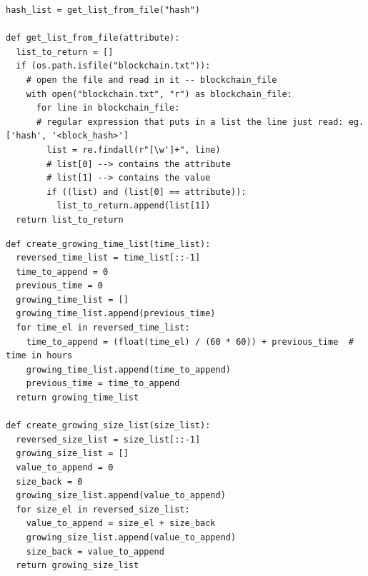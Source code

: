 \documentclass[USenglish]{uit-thesis}
\begin{document}
\begin{appendices}
\begin{lstlisting}[float, caption={Method that allows, given an attribute present in the blockchain.txt file, to create a list containing informations only about this quality using \emph{regular expressions}.}]
hash_list = get_list_from_file("hash")

def get_list_from_file(attribute):
  list_to_return = []
  if (os.path.isfile("blockchain.txt")):
    # open the file and read in it -- blockchain_file
    with open("blockchain.txt", "r") as blockchain_file:
      for line in blockchain_file:
      # regular expression that puts in a list the line just read: eg. ['hash', '<block_hash>']
        list = re.findall(r"[\w']+", line)
        # list[0] --> contains the attribute
        # list[1] --> contains the value
        if ((list) and (list[0] == attribute)):
          list_to_return.append(list[1])
  return list_to_return
\end{lstlisting}

\begin{lstlisting}[float, caption={Generation of the growing size and time lists. Calculated following the Equations~\ref{eq:growing_size},~\ref{eq:growing_time}.}]
def create_growing_time_list(time_list):
  reversed_time_list = time_list[::-1]
  time_to_append = 0
  previous_time = 0
  growing_time_list = []
  growing_time_list.append(previous_time)
  for time_el in reversed_time_list:
    time_to_append = (float(time_el) / (60 * 60)) + previous_time  # time in hours
    growing_time_list.append(time_to_append)
    previous_time = time_to_append
  return growing_time_list

def create_growing_size_list(size_list):
  reversed_size_list = size_list[::-1]
  growing_size_list = []
  value_to_append = 0
  size_back = 0
  growing_size_list.append(value_to_append)
  for size_el in reversed_size_list:
    value_to_append = size_el + size_back
    growing_size_list.append(value_to_append)
    size_back = value_to_append
  return growing_size_list
\end{lstlisting}


\end{appendices}
\end{document}

